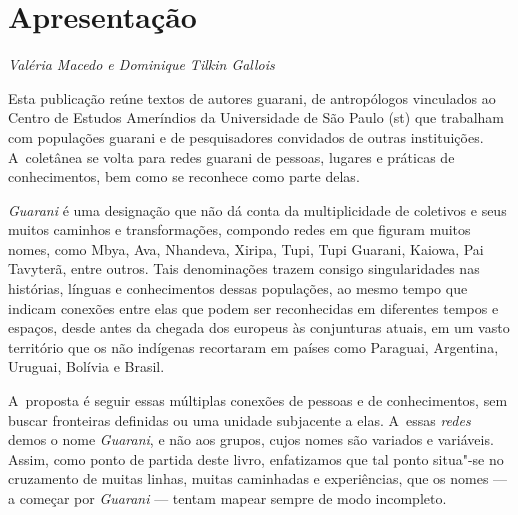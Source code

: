 
\chapter{Apresentação}
\begin{flushright}
\emph{Valéria Macedo e Dominique Tilkin Gallois}
\end{flushright}

\medskip
\noindent
Esta publicação reúne textos de autores guarani, de antropólogos
vinculados ao Centro de Estudos Ameríndios da Universidade de São Paulo
(st) que trabalham com populações guarani e de pesquisadores
convidados de outras instituições. A~coletânea se volta para redes
guarani de pessoas, lugares e práticas de conhecimentos, bem como se
reconhece como parte delas. 

\emph{Guarani} é uma designação que não dá conta da multiplicidade de coletivos
e seus muitos caminhos e transformações, compondo redes em que figuram
muitos nomes, como Mbya, Ava, Nhandeva, Xiripa, Tupi, Tupi Guarani,
Kaiowa, Pai Tavyterã, entre outros. Tais denominações trazem consigo
singularidades nas histórias, línguas e conhecimentos dessas
populações, ao mesmo tempo que indicam conexões entre elas que podem
ser reconhecidas em diferentes tempos e espaços, desde antes da chegada
dos europeus às conjunturas atuais, em um vasto território que os não
indígenas recortaram em países como Paraguai, Argentina, Uruguai,
Bolívia e Brasil.

A~proposta é seguir essas múltiplas conexões de pessoas e de
conhecimentos, sem buscar fronteiras definidas ou uma unidade
subjacente a elas. A~essas \emph{redes} demos o nome \emph{Guarani}, e não aos
grupos, cujos nomes são variados e variáveis. Assim, como ponto de
partida deste livro, enfatizamos que tal ponto situa"-se no cruzamento
de muitas linhas, muitas caminhadas e experiências, que os nomes --- a
começar por \emph{Guarani} --- tentam mapear sempre de modo incompleto.

